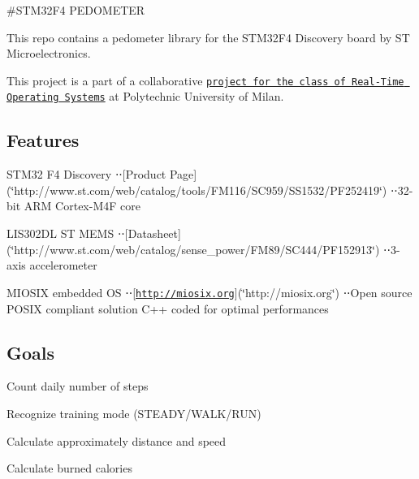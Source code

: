 \#\-S\-T\-M32\-F4 P\-E\-D\-O\-M\-E\-T\-E\-R

This repo contains a pedometer library for the S\-T\-M32\-F4 Discovery board by S\-T Microelectronics.

This project is a part of a collaborative \href{http://home.deib.polimi.it/bellasi/lib/exe/fetch.php?media=teaching:2013:201311_rtos_projectpresentation.pdf}{\tt project for the class of Real-\/\-Time Operating Systems} at Polytechnic University of Milan.

\subsection*{Features}


\begin{DoxyItemize}
\item S\-T\-M32 F4 Discovery ⋅⋅\mbox{[}Product Page\mbox{]}(\char`\"{}http\-://www.\-st.\-com/web/catalog/tools/\-F\-M116/\-S\-C959/\-S\-S1532/\-P\-F252419\char`\"{}) ⋅⋅32-\/bit A\-R\-M Cortex-\/\-M4\-F core
\item L\-I\-S302\-D\-L S\-T M\-E\-M\-S ⋅⋅\mbox{[}Datasheet\mbox{]}(\char`\"{}http\-://www.\-st.\-com/web/catalog/sense\-\_\-power/\-F\-M89/\-S\-C444/\-P\-F152913\char`\"{}) ⋅⋅3-\/axis accelerometer
\item M\-I\-O\-S\-I\-X embedded O\-S ⋅⋅\mbox{[}\href{http://miosix.org}{\tt http\-://miosix.\-org}\mbox{]}(\char`\"{}http\-://miosix.\-org\char`\"{}) ⋅⋅\-Open source P\-O\-S\-I\-X compliant solution C++ coded for optimal performances
\end{DoxyItemize}

\subsection*{Goals}


\begin{DoxyItemize}
\item Count daily number of steps
\item Recognize training mode (S\-T\-E\-A\-D\-Y/\-W\-A\-L\-K/\-R\-U\-N)
\item Calculate approximately distance and speed
\item Calculate burned calories 
\end{DoxyItemize}